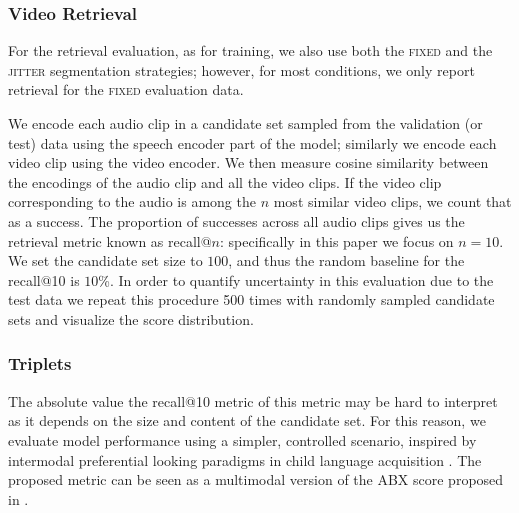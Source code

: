 \subsubsection{Video Retrieval}
\label{sec:retrieval}
For the retrieval evaluation, as for training, we also use both
the \textsc{fixed} and the \textsc{jitter} segmentation strategies;
however, for most conditions, we only report retrieval for the
\textsc{fixed} evaluation data.

We encode each audio clip in a candidate set sampled from the
validation (or test) data using the speech encoder part of the model;
similarly we encode each video clip using the video encoder. We then
measure cosine similarity between the encodings of the audio clip and
all the video clips. If the video clip corresponding to the audio is
among the $n$ most similar video clips, we count that as a
success. The proportion of successes across all audio clips gives us
the retrieval metric known as recall@$n$: specifically in this paper
we focus on $n=10$. We set the candidate set size to $100$, and thus
the random baseline for the recall@10 is $10$\%. In order to quantify
uncertainty in this evaluation due to the test data we repeat this
procedure 500 times with randomly sampled candidate sets and visualize
the score distribution.


\subsubsection{Triplets}
\label{sec:triplets}
The absolute value the recall@10 metric of this metric may be hard to
interpret as it depends on the size and content of the candidate set.
For this reason, we evaluate model performance using a simpler,
controlled scenario, inspired by intermodal preferential looking
paradigms in child language acquisition
\citep{hirsh1996intermodal}. The proposed metric can be seen as a
multimodal version of the ABX score proposed in \citet{schatz2016abx}.


